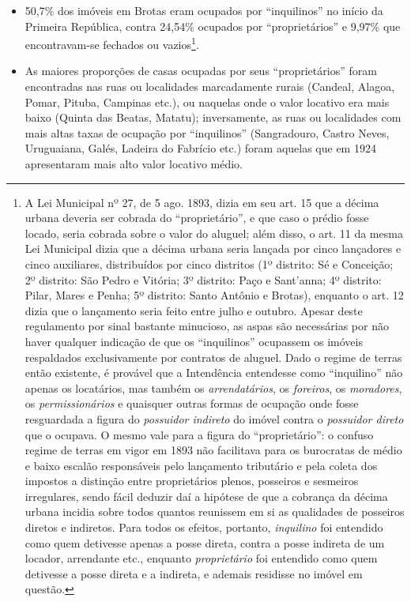 \begin{itemize}
\item 50,7\% dos imóveis em Brotas eram ocupados por ``inquilinos'' no início da Primeira República, contra 24,54\% ocupados por ``proprietários'' e 9,97\% que encontravam-se fechados ou vazios\footnote{A Lei Municipal nº 27, de 5 ago. 1893, dizia em seu art. 15 que a décima urbana deveria ser cobrada do ``proprietário'', e que caso o prédio fosse locado, seria cobrada sobre o valor do aluguel; além disso, o art. 11 da mesma Lei Municipal dizia que a décima urbana seria lançada por cinco lançadores e cinco auxiliares, distribuídos por cinco distritos (1º distrito: Sé e Conceição; 2º distrito: São Pedro e Vitória; 3º distrito: Paço e Sant'anna; 4º distrito: Pilar, Mares e Penha;  5º distrito: Santo Antônio e Brotas), enquanto o art. 12 dizia que o lançamento seria feito entre julho e outubro. Apesar deste regulamento por sinal bastante minucioso, as aspas são necessárias por não haver qualquer indicação de que os ``inquilinos'' ocupassem os imóveis respaldados exclusivamente por contratos de aluguel. Dado o regime de terras então existente, é provável que a Intendência entendesse como ``inquilino'' não apenas os locatários, mas também os \textit{arrendatários}, os \textit{foreiros}, os \textit{moradores}, os \textit{permissionários} e quaisquer outras formas de ocupação onde fosse resguardada a figura do \textit{possuidor indireto} do imóvel contra o \textit{possuidor direto} que o ocupava. O mesmo vale para a figura do ``proprietário'': o confuso regime de terras em vigor em 1893 não facilitava para os burocratas de médio e baixo escalão responsáveis pelo lançamento tributário e pela coleta dos impostos a distinção entre proprietários plenos, posseiros e sesmeiros irregulares, sendo fácil deduzir daí a hipótese de que a cobrança da décima urbana incidia sobre todos quantos reunissem em si as qualidades de posseiros diretos e indiretos. Para todos os efeitos, portanto, \textit{inquilino} foi entendido como quem detivesse apenas a posse direta, contra a posse indireta de um locador, arrendante etc., enquanto \textit{proprietário} foi entendido como quem detivesse a posse direta e a indireta, e ademais residisse no imóvel em questão.}.
\item As maiores proporções de casas ocupadas por seus ``proprietários'' foram encontradas nas ruas ou localidades marcadamente rurais (Candeal, Alagoa, Pomar, Pituba, Campinas etc.), ou naquelas onde o valor locativo era mais baixo (Quinta das Beatas, Matatu); inversamente, as ruas ou localidades com mais altas taxas de ocupação por ``inquilinos'' (Sangradouro, Castro Neves, Uruguaiana, Galés, Ladeira do Fabrício etc.) foram aquelas que em 1924 apresentaram mais alto valor locativo médio.

\end{itemize}
